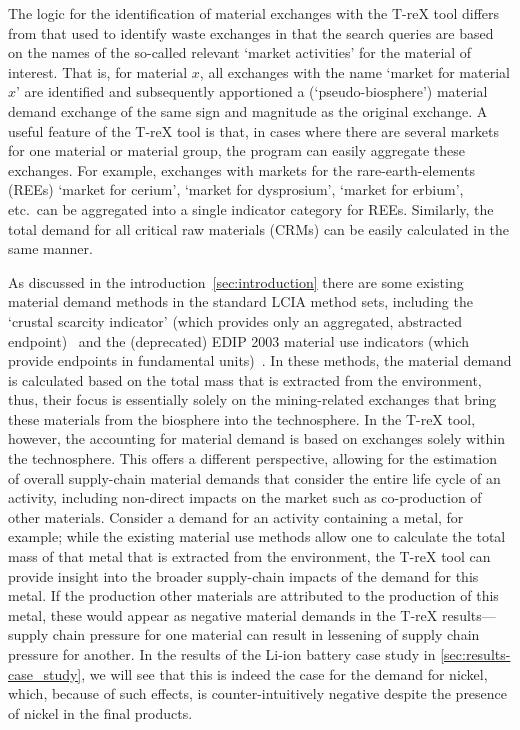 The logic for the identification of material exchanges with the T-reX tool differs from that used to identify waste exchanges in that the search queries are based on the names of the so-called relevant `market activities' for the material of interest. That is, for material $x$, all exchanges with the name `market for material $x$' are identified and subsequently apportioned a (`pseudo-biosphere') material demand exchange of the same sign and magnitude as the original exchange. A useful feature of the T-reX tool is that, in cases where there are several markets for one material or material group, the program can easily aggregate these exchanges. For example, exchanges with markets for the rare-earth-elements (REEs) `market for cerium', `market for dysprosium', `market for erbium', etc.\ can be aggregated into a single indicator category for REEs. Similarly, the total demand for all critical raw materials (CRMs) can be easily calculated in the same manner. 

As discussed in the introduction~\ref{sec:introduction} there are some existing material demand methods in the standard LCIA method sets, including the `crustal scarcity indicator' (which provides only an aggregated, abstracted endpoint)~\citep{arvidsson2020csi} and the (deprecated) EDIP 2003 material use indicators (which provide endpoints in fundamental units)~\citep{hauschild2003edip}. In these methods, the material demand is calculated based on the total mass that is extracted from the environment, thus, their focus is essentially solely on the mining-related exchanges that bring these materials from the biosphere into the technosphere. In the T-reX tool, however, the accounting for material demand is based on exchanges solely within the technosphere. This offers a different perspective, allowing for the estimation of overall supply-chain material demands that consider the entire life cycle of an activity, including non-direct impacts on the market such as co-production of other materials. Consider a demand for an activity containing a metal, for example; while the existing material use methods allow one to calculate the total mass of that metal that is extracted from the environment, the T-reX tool can provide insight into the broader supply-chain impacts of the demand for this metal. If the production other materials are attributed to the production of this metal, these would appear as negative material demands in the T-reX results---supply chain pressure for one material can result in lessening of supply chain pressure for another. In the results of the Li-ion battery case study in \autoref{sec:results-case_study}, we will see that this is indeed the case for the demand for nickel, which, because of such effects, is counter-intuitively negative despite the presence of nickel in the final products.


